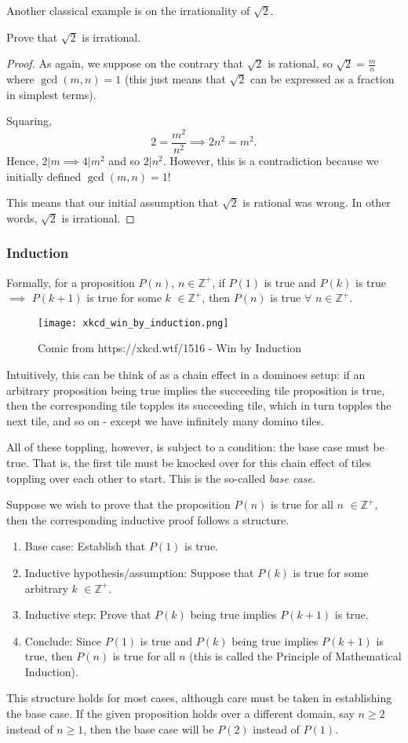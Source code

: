 \documentclass[../main.tex]{subfiles}
\begin{document}
Another classical example is on the irrationality of $\sqrt{2}$. 
\begin{example}[Classic]
    Prove that $\sqrt{2}$ is irrational.
\end{example}
\begin{proof}
As again, we suppose on the contrary that $\sqrt{2}$ is rational, so $\sqrt{2}=\frac{m}{n}$ where $\gcd(m,n)=1$ (this just means that $\sqrt{2}$ can be expressed as a fraction in simplest terms).

Squaring, $$2=\frac{m^2}{n^2} \implies 2n^2=m^2.$$ Hence, $2|m \implies 4|m^2$ and so $2|n^2$. However, this is a contradiction because we initially defined $\gcd(m,n)=1$! 

This means that our initial assumption that $\sqrt{2}$ is rational was wrong. In other words, $\sqrt{2}$ is irrational.
\end{proof}
\subsubsection{Induction}
Formally, for a proposition $P(n)$, $n\in\mathbb{Z}^+$, if $P(1)$ is true and $P(k)$ is true $\implies$ $P(k+1)$ is true for some $k$ $\in\mathbb{Z}^+$, then $P(n)$ is true $\forall$ $n\in\mathbb{Z}^+$.
\begin{figure}[H]
    \centering
    \texttt{[image: xkcd\_win\_by\_induction.png]}
    \caption{Comic from https://xkcd.wtf/1516 - Win by Induction}
\end{figure}
Intuitively, this can be think of as a chain effect in a dominoes setup: if an arbitrary proposition being true implies the succeeding tile proposition is true, then the corresponding tile topples its succeeding tile, which in turn topples the next tile, and so on - except we have infinitely many domino tiles.

All of these toppling, however, is subject to a condition: the base case must be true. That is, the first tile must be knocked over for this chain effect of tiles toppling over each other to start. This is the so-called \textit{base case}.

Suppose we wish to prove that the proposition $P(n)$ is true for all $n$ $\in\mathbb{Z}^+$, then the corresponding inductive proof follows a structure.
\begin{enumerate}
    \item Base case: Establish that $P(1)$ is true.
    \item Inductive hypothesis/assumption: Suppose that $P(k)$ is true for some arbitrary $k$ $\in\mathbb{Z}^+$. 
    \item Inductive step: Prove that $P(k)$ being true implies $P(k+1)$ is true. 
    \item Conclude: Since $P(1)$ is true and $P(k)$ being true implies $P(k+1)$ is true, then $P(n)$ is true for all $n$ (this is called the Principle of Mathematical Induction).
\end{enumerate}
This structure holds for most cases, although care must be taken in establishing the base case. If the given proposition holds over a different domain, say $n\geq 2$ instead of $n\geq 1$, then the base case will be $P(2)$ instead of $P(1)$.
\end{document}

